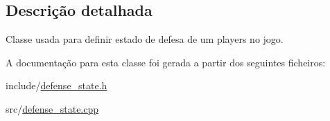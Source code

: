 \subsection{Descrição detalhada}
Classe usada para definir estado de defesa de um players no jogo. 

A documentação para esta classe foi gerada a partir dos seguintes ficheiros\+:\begin{DoxyCompactItemize}
\item 
include/\mbox{\hyperlink{defense__state_8h}{defense\+\_\+state.\+h}}\item 
src/\mbox{\hyperlink{defense__state_8cpp}{defense\+\_\+state.\+cpp}}\end{DoxyCompactItemize}
